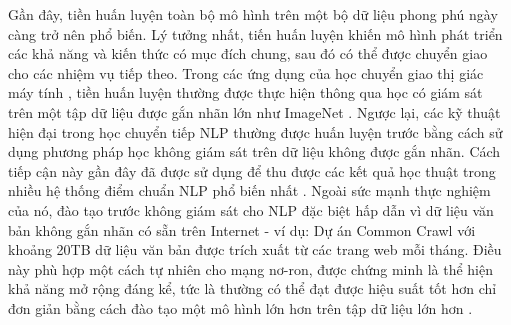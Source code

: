 \documentclass[10pt]{elsarticle}
\begin{document}
Gần đây, tiền huấn luyện toàn bộ mô hình trên một bộ dữ liệu phong phú ngày càng trở nên phổ biến. Lý tưởng nhất, tiến huấn luyện khiến mô hình phát triển các khả năng và kiến thức có mục đích chung, sau đó có thể được chuyển giao cho các nhiệm vụ tiếp theo. Trong các ứng dụng của học chuyển giao thị giác máy tính \citep{oquab2014learning, thrun2004advances, minyoung2016ImageNet}, tiền huấn luyện thường được thực hiện thông qua học có giám sát trên một tập dữ liệu được gắn nhãn lớn như ImageNet \citep{Deng2009ImageNet, Russakovsky2015ImageNet}. Ngược lại, các kỹ thuật hiện đại trong học chuyển tiếp NLP thường được huấn luyện trước bằng cách sử dụng phương pháp học không giám sát trên dữ liệu không được gắn nhãn. Cách tiếp cận này gần đây đã được sử dụng để thu được các kết quả học thuật trong nhiều hệ thống điểm chuẩn NLP phổ biến nhất \citep{kentonbert, dong2019unified, liu2019roberta}. Ngoài sức mạnh thực nghiệm của nó, đào tạo trước không giám sát cho NLP đặc biệt hấp dẫn vì dữ liệu văn bản không gắn nhãn có sẵn trên Internet - ví dụ: Dự án Common Crawl với khoảng 20TB dữ liệu văn bản được trích xuất từ các trang web mỗi tháng. Điều này phù hợp một cách tự nhiên cho mạng nơ-ron, được chứng minh là thể hiện khả năng mở rộng đáng kể, tức là thường có thể đạt được hiệu suất tốt hơn chỉ đơn giản bằng cách đào tạo một mô hình lớn hơn trên tập dữ liệu lớn hơn \citep{hestnessdeep, shazeer2017outrageously, jozefowicz2016exploring, mahajan2018exploring, radford2019language}.


\section*{}

{}
\end{document}
